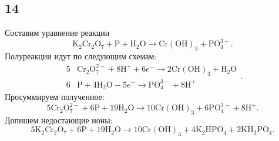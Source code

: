 \subsection{14}

Составим уравнение реакции
\[
\mathrm{K_2Cr_2O_7}+\mathrm{P}+\mathrm{H_2O}\longrightarrow\mathrm{Cr(OH)_3}+\mathrm{PO_4^{3-}}.
\]
Полуреакции идут по следующим схемам:
\[
\begin{array}{r|l}
	5 & \mathrm{Cr_2O_7^{2-}}+8\mathrm{H^+}+6e^-\longrightarrow2\mathrm{Cr(OH)_3}+\mathrm{H_2O} \\
	6 & \mathrm{P}+4\mathrm{H_2O}-5e^-\longrightarrow\mathrm{PO_4^{3-}}+8\mathrm{H^+}
\end{array}.
\]
Просуммируем полученное:
\[
5\mathrm{Cr_2O_7^{2-}}+6\mathrm{P}+19\mathrm{H_2O}\longrightarrow10\mathrm{Cr(OH)_3}+6\mathrm{PO_4^{3-}}+8\mathrm{H^+}.
\]
Допишем недостающие ионы:
\[
5\mathrm{K_2Cr_2O_7}+6\mathrm{P}+19\mathrm{H_2O}\longrightarrow10\mathrm{Cr(OH)_3}+4\mathrm{K_2HPO_4}+2\mathrm{KH_2PO_4}.
\]